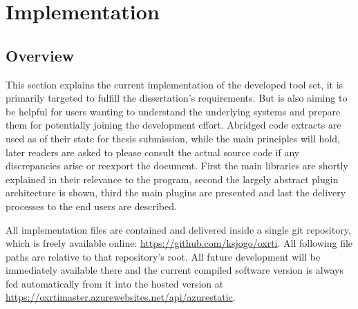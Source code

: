 \section{Implementation}

\subsection{Overview}
This section explains the current implementation of the developed tool set, it
is primarily targeted to fulfill the dissertation's requirements. But is also
aiming to be helpful for users wanting to understand the underlying systems and
prepare them for potentially joining the development effort. Abridged code
extracts are used as of their state for thesis submission, while the main
principles will hold, later readers are asked to please consult the actual
source code if any discrepancies arise or reexport the document. First the main libraries are shortly
explained in their relevance to the program, second the largely abstract plugin
architecture is shown, third the main plugins are presented and last the
delivery processes to the end users are described.


All implementation files are contained and delivered inside a single git
repository, which is freely available online:
\url{https://github.com/ksjogo/oxrti}. All following file paths are relative to that repository's root. All future development will
be immediately available there and the current compiled software version is
always fed automatically from it into the hosted version at \url{https://oxrtimaster.azurewebsites.net/api/azurestatic}.

